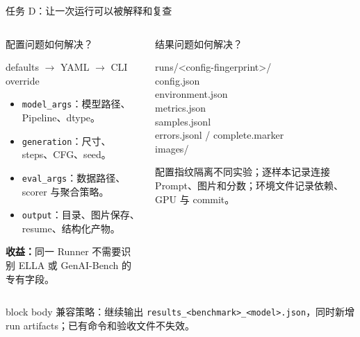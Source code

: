 \documentclass[aspectratio=169,10pt]{beamer}
\begin{document}
\begin{frame}{任务 D：让一次运行可以被解释和复查}
  \begin{columns}[T,onlytextwidth]
      \begin{block}{配置问题如何解决？}
        \begin{minipage}[c][4.65cm][c]{\linewidth}
          \centering\small
          defaults $\rightarrow$ YAML $\rightarrow$ CLI override
          \vspace{0.55em}
          \begin{itemize}\scriptsize
            \item \texttt{model\_args}：模型路径、Pipeline、dtype。
            \item \texttt{generation}：尺寸、steps、CFG、seed。
            \item \texttt{eval\_args}：数据路径、scorer 与聚合策略。
            \item \texttt{output}：目录、图片保存、resume、结构化产物。
          \end{itemize}
          \vspace{0.35em}
          \scriptsize\textbf{收益：}同一 Runner 不需要识别 ELLA 或 GenAI-Bench 的专有字段。
        \end{minipage}
      \end{block}
      \begin{block}{结果问题如何解决？}
        \begin{minipage}[c][4.65cm][c]{\linewidth}
          \scriptsize\ttfamily
          runs/<config-fingerprint>/\\
          \quad config.json\\
          \quad environment.json\\
          \quad metrics.json\\
          \quad samples.jsonl\\
          \quad errors.jsonl / complete.marker\\
          \quad images/
          \vspace{0.55em}

          \rmfamily\scriptsize
          配置指纹隔离不同实验；逐样本记录连接 Prompt、图片和分数；环境文件记录依赖、GPU 与 commit。
        \end{minipage}
      \end{block}
  \end{columns}

  \vspace{0.4em}
  \begin{beamercolorbox}[sep=0.6em,rounded=true]{block body}
    \centering\scriptsize
    兼容策略：继续输出 \texttt{results\_<benchmark>\_<model>.json}，同时新增 run artifacts；已有命令和验收文件不失效。
  \end{beamercolorbox}
\end{frame}
\end{document}
